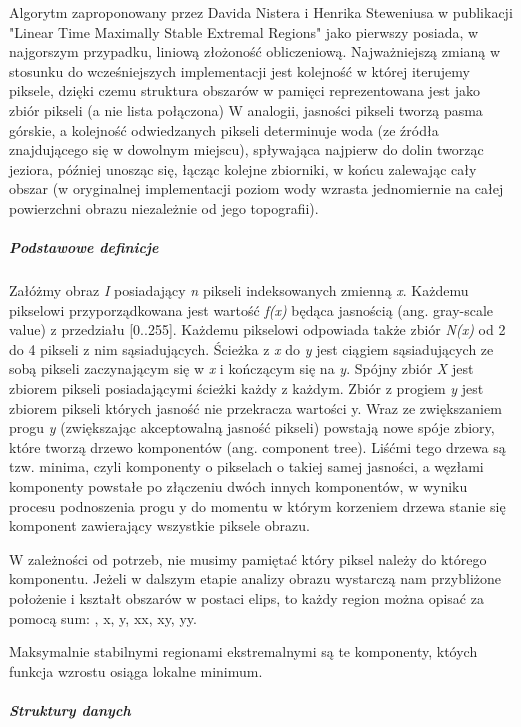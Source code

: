 Algorytm zaproponowany przez Davida Nistera i Henrika Steweniusa w publikacji
"Linear Time Maximally Stable Extremal Regions" jako pierwszy posiada, w
najgorszym przypadku, liniową złożoność obliczeniową. Najważniejszą zmianą w
stosunku do wcześniejszych implementacji jest kolejność w której iterujemy
piksele, dzięki czemu struktura obszarów w pamięci reprezentowana jest jako
zbiór pikseli (a nie lista połączona) W analogii, jasności pikseli tworzą pasma
górskie, a kolejność odwiedzanych pikseli determinuje woda (ze źródła
znajdującego się w dowolnym miejscu), spływająca najpierw do dolin tworząc
jeziora, później unosząc się, łącząc kolejne zbiorniki, w końcu zalewając cały
obszar (w oryginalnej implementacji poziom wody wzrasta jednomiernie na całej
powierzchni obrazu niezależnie od jego topografii).

\subparagraph{Podstawowe definicje}

Załóżmy obraz \textit{I} posiadający \textit{n} pikseli indeksowanych zmienną
\textit{x}. Każdemu pikselowi przyporządkowana jest wartość \textit{f(x)}
będąca jasnością (ang. gray-scale value) z przedziału [0..255]. Każdemu
pikselowi odpowiada także zbiór \textit{N(x)} od 2 do 4 pikseli z nim
sąsiadujących. Ścieżka z \textit{x} do \textit{y} jest ciągiem sąsiadujących ze
sobą pikseli zaczynającym się w \textit{x} i kończącym się na \textit{y}.
Spójny zbiór \textit{X} jest zbiorem pikseli posiadającymi ścieżki każdy z
każdym. Zbiór z progiem \textit{y} jest zbiorem pikseli których jasność nie
przekracza wartości y. Wraz ze zwiększaniem progu \textit{y} (zwiększając
akceptowalną jasność pikseli) powstają nowe spóje zbiory, które tworzą drzewo
komponentów (ang. component tree). Liśćmi tego drzewa są tzw. minima, czyli
komponenty o pikselach o takiej samej jasności, a węzłami komponenty powstałe
po złączeniu dwóch innych komponentów, w wyniku procesu podnoszenia progu y do
momentu w którym korzeniem drzewa stanie się komponent zawierający wszystkie
piksele obrazu.

W zależności od potrzeb, nie musimy pamiętać który piksel należy do którego
komponentu. Jeżeli w dalszym etapie analizy obrazu wystarczą nam przybliżone
położenie i kształt obszarów w postaci elips, to każdy region można opisać za
pomocą sum: , x, y, xx, xy, yy.

Maksymalnie stabilnymi regionami ekstremalnymi są te komponenty, któych funkcja
wzrostu osiąga lokalne minimum. 

\subparagraph{Struktury danych}

